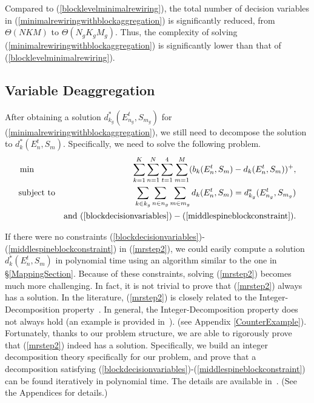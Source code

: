 \documentclass[letterpaper,twocolumn,10pt]{article}
\begin{document}
Compared to (\ref{blocklevelminimalrewiring}), the total number of decision variables in (\ref{minimalrewiringwithblockaggregation}) is significantly reduced, from $\Theta(NKM)$ to $\Theta(N_gK_gM_g)$. Thus, the complexity of solving (\ref{minimalrewiringwithblockaggregation}) is significantly lower than that of (\ref{blocklevelminimalrewiring}).

\subsection{Variable Deaggregation}
After obtaining a solution $d^*_{k_g}(E_{n_g}^t, S_{m_g})$ for (\ref{minimalrewiringwithblockaggregation}), we still need to decompose the solution to $d^*_{k}(E_{n}^t, S_{m})$. Specifically, we need to solve the following problem.
\begin{eqnarray}\label{mrstep2}
&\min&\sum_{k=1}^K\sum_{n=1}^N\sum_{t=1}^4\sum_{m=1}^M(b_k(E_n^t,S_m)-d_k(E_n^t,S_m))^+,\nonumber\\
&\text{subject to}& \sum_{k\in k_g}\sum_{n\in n_g}\sum_{m\in m_g}d_k(E_n^t, S_m)=d^*_{k_g}(E_{n_g}^t, S_{m_g})\nonumber\\
&&\text{and }(\ref{blockdecisionvariables})-(\ref{middlespineblockconstraint}).
\end{eqnarray}

If there were no constraints (\ref{blockdecisionvariables})-(\ref{middlespineblockconstraint}) in (\ref{mrstep2}), we could easily compute a solution $d^*_{k}(E_{n}^t, S_{m})$ in polynomial time using an algorithm similar to the one in \S\ref{MappingSection}.
Because of these constraints, solving (\ref{mrstep2}) becomes much more challenging. In fact, it is not trivial to prove that (\ref{mrstep2}) always has a solution. In the literature, (\ref{mrstep2}) is closely related to the Integer-Decomposition property~\cite{IntegerDecomposition}. In general, the Integer-Decomposition property does not always hold 
\ifpaper (an example is provided in~\cite{TechnicalReport}).
\else (see Appendix \ref{CounterExample}).
\fi
 Fortunately, thanks to our problem structure, we are able to rigorously prove that (\ref{mrstep2}) indeed has a solution. Specifically, we build an integer decomposition theory specifically for our problem, and prove that a decomposition satisfying (\ref{blockdecisionvariables})-(\ref{middlespineblockconstraint}) can be found iteratively in polynomial time. 
\ifpaper The details are available in~\cite{TechnicalReport}.
\else (See the Appendices for details.)
\fi
\end{document}
